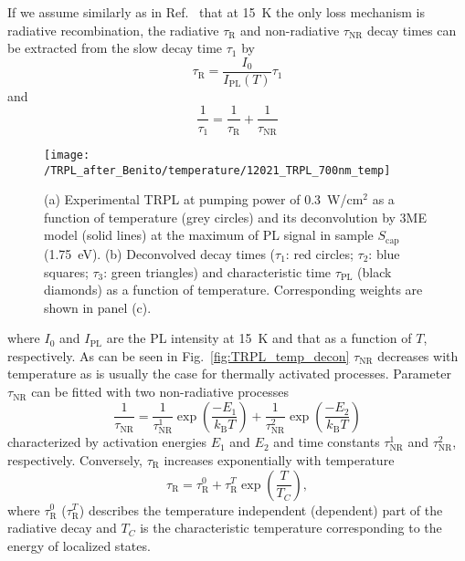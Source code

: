 If we assume similarly as in Ref.~\citep{t_alvarez} that at 15~K the only loss mechanism is radiative recombination, the radiative $\tau_\mathrm{R}$ and non-radiative $\tau_\mathrm{NR}$ decay times can be extracted from the slow decay time $\tau_1$ by
%
\begin{equation}
\tau_\mathrm{R}=\frac{I_0}{I_\mathrm{PL}(T)}\tau_1 \label{eq:tau_R_fromtau1}
\end{equation}
and
\begin{equation}
\frac{1}{\tau_1}=\frac{1}{\tau_\mathrm{R}} + \frac{1}{\tau_\mathrm{NR}}
\end{equation}
%
\begin{figure}
	\centering
	\texttt{[image: /TRPL\_after\_Benito/temperature/12021\_TRPL\_700nm\_temp]}
	\caption{(a) Experimental TRPL at pumping power of 0.3~W/cm$^2$ as a function of temperature (grey circles) and its deconvolution by 3ME model (solid lines) at the maximum of PL signal in sample $S_\mathrm{cap}$ (1.75~eV). (b) Deconvolved decay times ($\tau_1$: red circles; $\tau_2$: blue squares; $\tau_3$: green triangles) and characteristic time $\tau_\mathrm{PL}$ (black diamonds) as a function of temperature. Corresponding weights are shown in panel (c).}
	\label{fig:TRPL_temp_c}
\end{figure}
%

\noindent where $I_0$ and $I_\mathrm{PL}$ are the PL intensity at 15~K and that as a function of $T$, respectively. As can be seen in Fig.~\ref{fig:TRPL_temp_decon} $\tau_\mathrm{NR}$ decreases with temperature as is usually the case for thermally activated processes. Parameter $\tau_\mathrm{NR}$ can be fitted with two non-radiative processes 
%
\begin{equation}
\frac{1}{\tau_\mathrm{NR}}=\frac{1}{\tau_\mathrm{NR}^1}\exp{\left(\frac{-E_1}{k_\mathrm{B}T}\right)} + \frac{1}{\tau_\mathrm{NR}^2}\exp{\left(\frac{-E_2}{k_\mathrm{B}T}\right)} \label{eq:nonradiative}
\end{equation}
characterized by activation energies $E_1$ and $E_2$ and time constants $\tau_\mathrm{NR}^1$ and $\tau_\mathrm{NR}^2$, respectively.
Conversely, $\tau_\mathrm{R}$ increases exponentially with temperature
%
\begin{equation}
\tau_\mathrm{R} = \tau_\mathrm{R}^0 + \tau_\mathrm{R}^T \exp{\left(\frac{T}{T_C}\right)}, \label{eq:tau_R} 
\end{equation}
where $ \tau_\mathrm{R}^0$ ($ \tau_\mathrm{R}^T$) describes the temperature independent (dependent) part of the radiative decay and $T_C$ is the characteristic temperature corresponding to the energy of localized states. 

